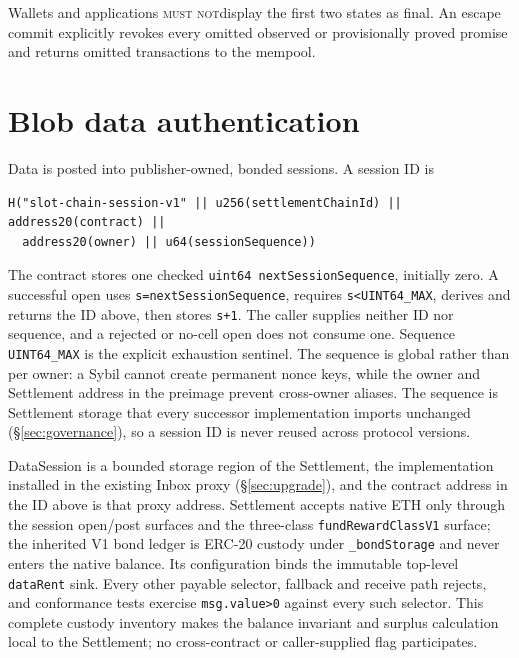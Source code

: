 \documentclass[a4paper,11pt]{article}
\newcommand{\code}[1]{\nolinkurl{#1}}
\newcommand{\mustnot}{\textsc{must not}}
\begin{document}
Wallets and applications \mustnot display the first two states as final.  An
escape commit explicitly revokes every omitted observed or provisionally proved
promise and returns omitted transactions to the mempool.

\section{Blob data authentication}\label{sec:data}

Data is posted into publisher-owned, bonded sessions.  A session ID is
\begin{verbatim}
H("slot-chain-session-v1" || u256(settlementChainId) || address20(contract) ||
  address20(owner) || u64(sessionSequence))
\end{verbatim}
The contract stores one checked \code{uint64 nextSessionSequence}, initially
zero.  A successful open uses \code{s=nextSessionSequence}, requires
\code{s<UINT64_MAX}, derives and returns the ID above, then stores \code{s+1}.
The caller supplies neither ID nor sequence, and a rejected or no-cell open
does not consume one.  Sequence \code{UINT64_MAX} is the explicit exhaustion
sentinel.  The sequence is global rather than per owner: a Sybil cannot create
permanent nonce keys, while the owner and Settlement address in the preimage
prevent cross-owner aliases.  The sequence is Settlement storage that every
successor implementation imports unchanged (\S\ref{sec:governance}), so a
session ID is never reused across protocol versions.

DataSession is a bounded storage region of the Settlement, the implementation
installed in the existing Inbox proxy (\S\ref{sec:upgrade}), and the contract
address in the ID above is that proxy address.  Settlement accepts native ETH
only through the session open/post surfaces and the three-class
\code{fundRewardClassV1} surface; the inherited V1 bond ledger is ERC-20
custody under \code{_bondStorage} and never enters the native balance.  Its
configuration binds the immutable top-level \code{dataRent} sink.  Every other
payable selector, fallback and receive path rejects, and conformance tests
exercise \code{msg.value>0} against every such selector.  This complete custody
inventory makes the balance invariant and surplus calculation local to the
Settlement; no cross-contract or caller-supplied flag participates.
\end{document}
